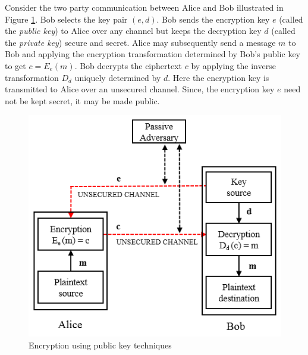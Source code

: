 	Consider the two party communication between Alice and Bob illustrated in Figure \ref{fig:public-key}. 
	Bob selects the key pair $(e, d)$. 
	Bob sends the encryption key $e$ (called the \textit{public key}) to Alice over any channel but keeps the decryption key $d$ (called the \textit{private key}) secure and secret.
	Alice may subsequently send a message $m$ to Bob and applying the encryption transformation determined by Bob's public key to get $c = E_{e}(m)$.
	Bob decrypts the ciphertext $c$ by applying the inverse transformation $D_{d}$ uniquely determined by $d$.
	Here the encryption key is transmitted to Alice over an unsecured channel.
	Since, the encryption key $e$ need not be kept secret, it may be made public.
	\begin{figure}[h!]
		\centering
		\includegraphics{images/public-key.png}
		\caption{Encryption using public key techniques}
		\label{fig:public-key}
	\end{figure}

